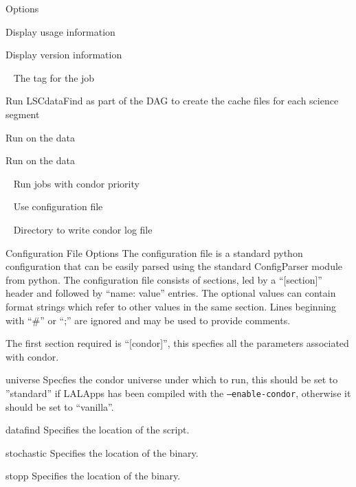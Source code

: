 \begin{entry}
\item[Options]\leavevmode
\begin{entry}
\item[\option{--help}] Display usage information
\item[\option{--version}] Display version information
\item[\option{--user-tag}~\parm{TAG}] The tag for the job
\item[\option{--datafind}] Run LSCdataFind as part of the DAG to create
the cache files for each science segment
\item[\option{--stochastic}] Run  on the data
\item[\option{--stopp}] Run  on the data
\item[\option{--priority}~\parm{PRIO}] Run jobs with condor priority 
\item[\option{--config-file}~\parm{FILE}] Use configuration file 
\item[\option{--log-path}~\parm{PATH}] Directory to write condor log file
\end{entry}

\item[Configuration File Options]
The configuration file is a standard python configuration that can be
easily parsed using the standard ConfigParser module from python. The
configuration file consists of sections, led by a ``[section]'' header
and followed by ``name: value'' entries. The optional values can contain
format strings which refer to other values in the same section. Lines
beginning with ``\#'' or ``;'' are ignored and may be used to provide
comments.

The first section required is ``[condor]'', this specfies all the
parameters associated with condor.
\begin{entry}
\item[universe]
Specfies the condor universe under which to run, this should be set to
''standard'' if LALApps has been compiled with the
\texttt{--enable-condor}, otherwise it should be set to ``vanilla''.
\item[datafind]
Specifies the location of the  script.
\item[stochastic]
Specifies the location of the  binary.
\item[stopp]
Specifies the location of the  binary.
\end{entry}


\end{entry}
